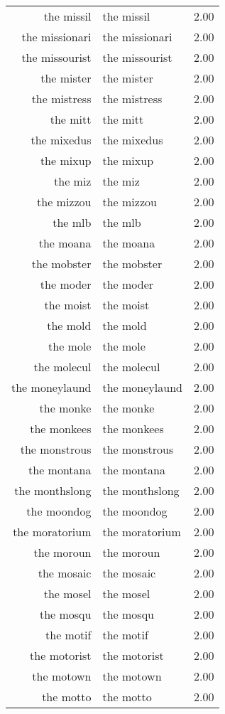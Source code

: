 \begin{table}[ht]
\begin{tabular}{rlr}
  the missil & the missil & 2.00 \\ 
  the missionari & the missionari & 2.00 \\ 
  the missourist & the missourist & 2.00 \\ 
  the mister & the mister & 2.00 \\ 
  the mistress & the mistress & 2.00 \\ 
  the mitt & the mitt & 2.00 \\ 
  the mixedus & the mixedus & 2.00 \\ 
  the mixup & the mixup & 2.00 \\ 
  the miz & the miz & 2.00 \\ 
  the mizzou & the mizzou & 2.00 \\ 
  the mlb & the mlb & 2.00 \\ 
  the moana & the moana & 2.00 \\ 
  the mobster & the mobster & 2.00 \\ 
  the moder & the moder & 2.00 \\ 
  the moist & the moist & 2.00 \\ 
  the mold & the mold & 2.00 \\ 
  the mole & the mole & 2.00 \\ 
  the molecul & the molecul & 2.00 \\ 
  the moneylaund & the moneylaund & 2.00 \\ 
  the monke & the monke & 2.00 \\ 
  the monkees & the monkees & 2.00 \\ 
  the monstrous & the monstrous & 2.00 \\ 
  the montana & the montana & 2.00 \\ 
  the monthslong & the monthslong & 2.00 \\ 
  the moondog & the moondog & 2.00 \\ 
  the moratorium & the moratorium & 2.00 \\ 
  the moroun & the moroun & 2.00 \\ 
  the mosaic & the mosaic & 2.00 \\ 
  the mosel & the mosel & 2.00 \\ 
  the mosqu & the mosqu & 2.00 \\ 
  the motif & the motif & 2.00 \\ 
  the motorist & the motorist & 2.00 \\ 
  the motown & the motown & 2.00 \\ 
  the motto & the motto & 2.00 \\ 

\end{tabular}
\end{table}
